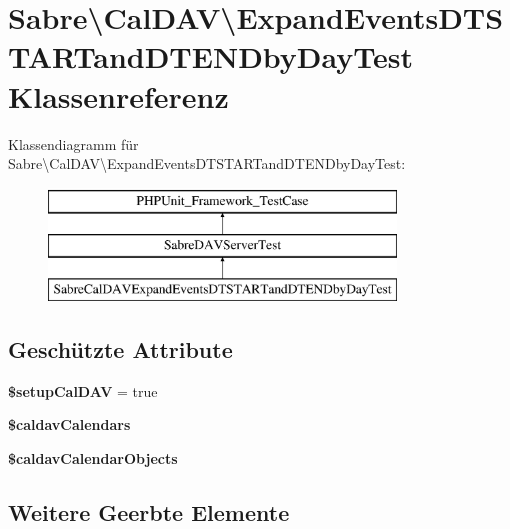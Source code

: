 \hypertarget{class_sabre_1_1_cal_d_a_v_1_1_expand_events_d_t_s_t_a_r_tand_d_t_e_n_dby_day_test}{}\section{Sabre\textbackslash{}Cal\+D\+AV\textbackslash{}Expand\+Events\+D\+T\+S\+T\+A\+R\+Tand\+D\+T\+E\+N\+Dby\+Day\+Test Klassenreferenz}
\label{class_sabre_1_1_cal_d_a_v_1_1_expand_events_d_t_s_t_a_r_tand_d_t_e_n_dby_day_test}
Klassendiagramm für Sabre\textbackslash{}Cal\+D\+AV\textbackslash{}Expand\+Events\+D\+T\+S\+T\+A\+R\+Tand\+D\+T\+E\+N\+Dby\+Day\+Test\+:\begin{figure}[H]
\begin{center}
\leavevmode
\includegraphics[height=3.000000cm]{class_sabre_1_1_cal_d_a_v_1_1_expand_events_d_t_s_t_a_r_tand_d_t_e_n_dby_day_test}
\end{center}
\end{figure}
\subsection*{Geschützte Attribute}
\begin{DoxyCompactItemize}
\item 
\mbox{\label{class_sabre_1_1_cal_d_a_v_1_1_expand_events_d_t_s_t_a_r_tand_d_t_e_n_dby_day_test_add305e2444746d4ee543bac6bdb27e64}} 
{\bfseries \$setup\+Cal\+D\+AV} = true
\item 
{\bfseries \$caldav\+Calendars}
\item 
{\bfseries \$caldav\+Calendar\+Objects}
\end{DoxyCompactItemize}
\subsection*{Weitere Geerbte Elemente}


